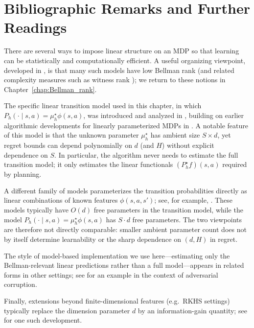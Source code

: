 \section{Bibliographic Remarks and Further Readings}

There are several ways to impose linear structure on an MDP so that learning can be
statistically and computationally efficient.  A useful organizing viewpoint, developed in
\citet{jiang2017contextual}, is that many such models have low Bellman rank (and related
complexity measures such as witness rank \citep{sun2019model}); we return to these notions
in Chapter~\ref{chap:Bellman_rank}.

The specific linear transition model used in this chapter, in which
$P_h(\cdot\mid s,a)=\mu_h^\star \phi(s,a)$, was introduced and analyzed in \citet{jin2020provably},
building on earlier algorithmic developments for linearly parameterized MDPs in
\citet{yang2019reinforcement,yang2019sample}.  A notable feature of this model is that the
unknown parameter $\mu_h^\star$ has ambient size $S\times d$, yet regret bounds can depend
polynomially on $d$ (and $H$) without explicit dependence on $S$.  In particular, the algorithm
never needs to estimate the full transition model; it only estimates the linear functionals
$(P_h^\star f)(s,a)$ required by planning.

A different family of models parameterizes the transition probabilities directly as linear
combinations of known features $\phi(s,a,s')$; see, for example,
\citet{lin_comb_model_est,pmlr-v120-jia20a,ayoub2020,zhou2020provably}.  These models
typically have $O(d)$ free parameters in the transition model, while the model
$P_h(\cdot\mid s,a)=\mu_h^\star \phi(s,a)$ has $S\cdot d$ free parameters.  The two viewpoints
are therefore not directly comparable: smaller ambient parameter count does not by itself
determine learnability or the sharp dependence on $(d,H)$ in regret.

The style of model-based implementation we use here—estimating only the Bellman-relevant
linear predictions rather than a full model—appears in related forms in other settings; see
\citet{lykouris2019corruption} for an example in the context of adversarial corruption.

Finally, extensions beyond finite-dimensional features (e.g.\ RKHS settings) typically replace
the dimension parameter $d$ by an information-gain quantity; see \citet{agarwal2020pc} for one
such development.


